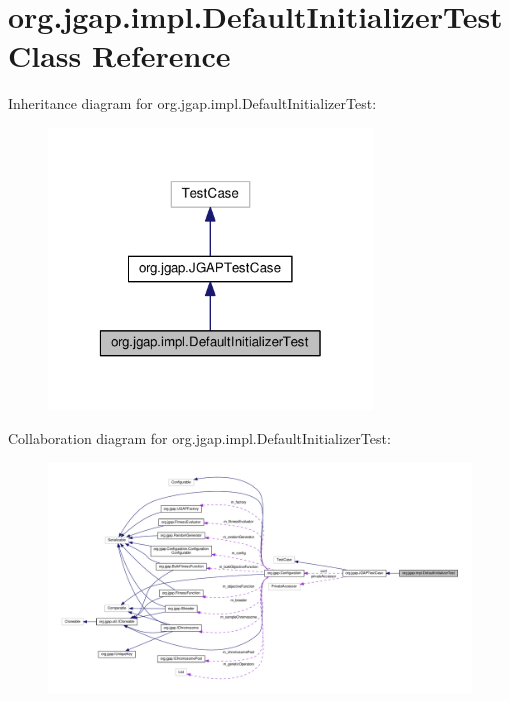 \hypertarget{classorg_1_1jgap_1_1impl_1_1_default_initializer_test}{\section{org.\-jgap.\-impl.\-Default\-Initializer\-Test Class Reference}
\label{classorg_1_1jgap_1_1impl_1_1_default_initializer_test}
}


Inheritance diagram for org.\-jgap.\-impl.\-Default\-Initializer\-Test\-:
\nopagebreak
\begin{figure}[H]
\begin{center}
\leavevmode
\includegraphics[width=244pt]{classorg_1_1jgap_1_1impl_1_1_default_initializer_test__inherit__graph}
\end{center}
\end{figure}


Collaboration diagram for org.\-jgap.\-impl.\-Default\-Initializer\-Test\-:
\nopagebreak
\begin{figure}[H]
\begin{center}
\leavevmode
\includegraphics[width=350pt]{classorg_1_1jgap_1_1impl_1_1_default_initializer_test__coll__graph}
\end{center}
\end{figure}
